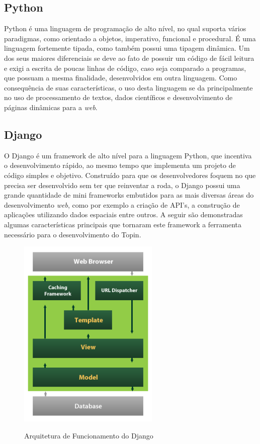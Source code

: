 {{{{{{{\subsection{Python}

Python é uma linguagem de programação de alto nível, no qual suporta vários paradigmas, como orientado a objetos, imperativo, funcional e procedural. É uma linguagem fortemente tipada, como também possui uma tipagem dinâmica. Um dos seus maiores diferenciais se deve ao fato de possuir um código de fácil leitura e exigi a escrita de poucas linhas de código, caso seja comparado a programas, que possuam a mesma finalidade, desenvolvidos em outra linguagem. Como consequência de suas características, o uso desta linguagem se da principalmente no uso de processamento de textos, dados científicos e desenvolvimento de páginas dinâmicas para a \textit{web}.

\subsection{Django}

O Django é um framework de alto nível para a linguagem Python, que incentiva o desenvolvimento rápido, ao mesmo tempo que implementa um projeto de código simples e objetivo. Construído para que os desenvolvedores foquem no que precisa ser desenvolvido sem ter que reinventar a roda, o Django possui uma grande quantidade de mini frameworks embutidos para as mais diversas áreas do desenvolvimento \textit{web}, como por exemplo a criação de API's, a construção de aplicações utilizando dados espaciais entre outros. A seguir são demonstradas algumas características principais que tornaram este framework a ferramenta necessário para o desenvolvimento do Topin.

\begin{figure}[H]
\caption{Arquitetura de Funcionamento do Django}
\centering
\includegraphics[width=0.6\textwidth]{imagens/django.png}
\label{fig:django}
\end{figure}

}}}}}}}
